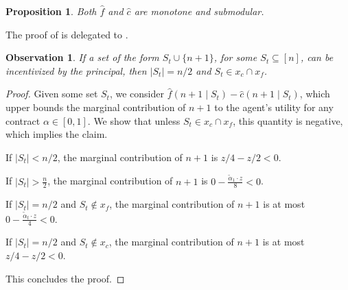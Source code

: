 \documentclass[11pt]{article}
\newtheorem{observation}{Observation}
\newtheorem{proposition}{Proposition}
\newcommand{\talpha}{\tilde{\alpha}}
\newcommand{\hf}{\hat{f}}
\newcommand{\hc}{\hat{c}}
\begin{document}
\begin{proposition}\label{prop:monotone_submod_hf_hc}
    Both $\hf$ and $\hc$ are monotone and submodular.
\end{proposition}
The proof of  is delegated to .

\begin{observation}\label{obs:n+1Incentivizable}   
    If a set of the form $S_t \cup \{n+1\}$, for some $S_t \subseteq [n]$, can be incentivized by the principal, then $|S_t| = n/2$ and $S_t \in x_c \cap x_f$.
\end{observation}
\begin{proof}
Given some set $S_t$, we consider $\hf(n+1 \mid S_t) - \hc(n+1 \mid S_t)$, which upper bounds the marginal contribution of $n+1$ to the agent's utility for any contract $\alpha \in [0,1]$. 
We show that unless $S_t \in x_c \cap x_f$, this quantity is negative, which implies the claim. 

    If $|S_t|<n/2$, the marginal contribution of $n+1$ is $z/4 - z/2 < 0$.
    
    If $|S_t| > \frac{n}{2}$, the marginal contribution of $n+1$ is $0 - \frac{\talpha_1\cdot z}{8} < 0$.
    
    If $|S_t|=n/2$ and $S_t \notin x_f$, the marginal contribution of $n+1$ is at most $0 - \frac{\talpha_t\cdot z}{4} < 0$.
    
    If $|S_t|=n/2$ and $S_t \notin x_c$, the marginal contribution of $n+1$ is at most $z/4 - z/2 < 0$.

    This concludes the proof.
\end{proof}
\end{document}
